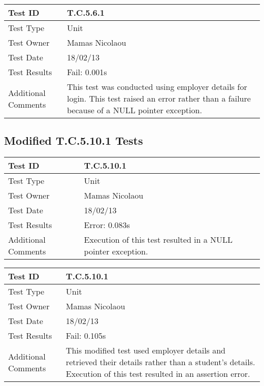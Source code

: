 \documentclass{l3deliverable}
\begin{document}
\vspace{4 mm}

\begin{tabular}{|p{2cm}|p{12cm}|}
\hline
Test ID & T.C.5.6.1\\
\hline
Test Type & Unit\\
\hline
Test Owner  & Mamas Nicolaou\\
\hline
Test Date & 18/02/13\\
\hline
Test Results & Fail: 0.001s\\
\hline
Additional Comments & This test was conducted using employer details for login. This test raised an error rather than a failure because of a NULL pointer exception.\\
\hline
\end{tabular}

\subsection{Modified T.C.5.10.1 Tests}

\begin{tabular}{|p{2cm}|p{12cm}|}
\hline
Test ID & T.C.5.10.1\\
\hline
Test Type & Unit\\
\hline
Test Owner  & Mamas Nicolaou\\
\hline
Test Date & 18/02/13\\
\hline
Test Results & Error: 0.083s\\
\hline
Additional Comments & Execution of this test resulted in a NULL pointer exception.\\
\hline
\end{tabular}

\vspace{4 mm}

\begin{tabular}{|p{2cm}|p{12cm}|}
\hline
Test ID & T.C.5.10.1\\
\hline
Test Type & Unit\\
\hline
Test Owner  & Mamas Nicolaou\\
\hline
Test Date & 18/02/13\\
\hline
Test Results & Fail: 0.105s\\
\hline
Additional Comments & This modified test used employer details and retrieved their details rather than a student's details. Execution of this test resulted in an assertion error.\\
\hline
\end{tabular}
\end{document}
